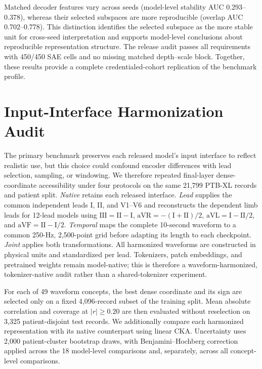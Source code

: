 Matched decoder features vary across seeds (model-level stability AUC 0.293--0.378), whereas their selected subspaces are more reproducible (overlap AUC 0.702--0.778). This distinction identifies the selected subspace as the more stable unit for cross-seed interpretation and supports model-level conclusions about reproducible representation structure. The release audit passes all requirements with 450/450 SAE cells and no missing matched depth--scale block. Together, these results provide a complete credentialed-cohort replication of the benchmark profile.

\section{Input-Interface Harmonization Audit}
\label{app:input-harmonization}

The primary benchmark preserves each released model's input interface to reflect realistic use, but this choice could confound encoder differences with lead selection, sampling, or windowing. We therefore repeated final-layer dense-coordinate accessibility under four protocols on the same 21,799 PTB-XL records and patient split. \emph{Native} retains each released interface. \emph{Lead} supplies the common independent leads I, II, and V1--V6 and reconstructs the dependent limb leads for 12-lead models using
$\mathrm{III}=\mathrm{II}-\mathrm{I}$,
$\mathrm{aVR}=-(\mathrm{I}+\mathrm{II})/2$,
$\mathrm{aVL}=\mathrm{I}-\mathrm{II}/2$, and
$\mathrm{aVF}=\mathrm{II}-\mathrm{I}/2$.
\emph{Temporal} maps the complete 10-second waveform to a common 250-Hz, 2,500-point grid before adapting its length to each checkpoint. \emph{Joint} applies both transformations. All harmonized waveforms are constructed in physical units and standardized per lead. Tokenizers, patch embeddings, and pretrained weights remain model-native; this is therefore a waveform-harmonized, tokenizer-native audit rather than a shared-tokenizer experiment.

For each of 49 waveform concepts, the best dense coordinate and its sign are selected only on a fixed 4,096-record subset of the training split. Mean absolute correlation and coverage at $|r|\geq0.20$ are then evaluated without reselection on 3,325 patient-disjoint test records. We additionally compare each harmonized representation with its native counterpart using linear CKA. Uncertainty uses 2,000 patient-cluster bootstrap draws, with Benjamini--Hochberg correction applied across the 18 model-level comparisons and, separately, across all concept-level comparisons.

